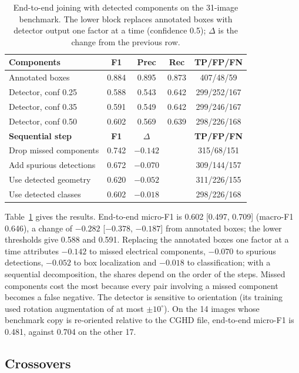 \documentclass[journal]{IEEEtran}
\begin{document}
\begin{table}[t]
\caption{End-to-end joining with detected components on the 31-image benchmark. The lower block replaces annotated boxes with detector output one factor at a time (confidence 0.5); {$\Delta$} is the change from the previous row.}
\label{tab:e2e}
\centering
\footnotesize
\setlength{\tabcolsep}{4pt}
\begin{tabular}{lcccc}
\toprule
\textbf{Components} & \textbf{F1} & \textbf{Prec} & \textbf{Rec} & \textbf{TP/FP/FN} \\
\midrule
Annotated boxes & 0.884 & 0.895 & 0.873 & 407/48/59 \\
Detector, conf 0.25 & 0.588 & 0.543 & 0.642 & 299/252/167 \\
Detector, conf 0.35 & 0.591 & 0.549 & 0.642 & 299/246/167 \\
Detector, conf 0.50 & 0.602 & 0.569 & 0.639 & 298/226/168 \\
\midrule
\textbf{Sequential step} & \textbf{F1} & \textbf{$\Delta$} & & \textbf{TP/FP/FN} \\
\midrule
Drop missed components & 0.742 & $-0.142$ & & 315/68/151 \\
Add spurious detections & 0.672 & $-0.070$ & & 309/144/157 \\
Use detected geometry & 0.620 & $-0.052$ & & 311/226/155 \\
Use detected classes & 0.602 & $-0.018$ & & 298/226/168 \\
\bottomrule
\end{tabular}
\end{table}

Table~\ref{tab:e2e} gives the results. End-to-end micro-F1 is 0.602 [0.497, 0.709] (macro-F1 0.646), a change of $-0.282$ [$-0.378$, $-0.187$] from annotated boxes; the lower thresholds give 0.588 and 0.591. Replacing the annotated boxes one factor at a time attributes $-0.142$ to missed electrical components, $-0.070$ to spurious detections, $-0.052$ to box localization and $-0.018$ to classification; with a sequential decomposition, the shares depend on the order of the steps. Missed components cost the most because every pair involving a missed component becomes a false negative. The detector is sensitive to orientation (its training used rotation augmentation of at most $\pm10^{\circ}$). On the 14 images whose benchmark copy is re-oriented relative to the CGHD file, end-to-end micro-F1 is 0.481, against 0.704 on the other 17.

\subsection{Crossovers}
\label{sec:crossovers}
\end{document}

